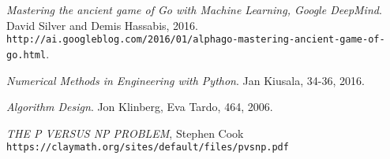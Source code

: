 \documentclass[a4paper]{article}
\numberwithin{equation}{subsection}
\begin{document}
\begin{thebibliography}{9}
\textit{Mastering the ancient game of Go with Machine Learning, Google DeepMind}.
 David Silver and Demis Hassabis, 2016.
\\\texttt{http://ai.googleblog.com/2016/01/alphago-mastering-ancient-game-of-go.html}.

\textit{Numerical Methods in Engineering with Python}.  
Jan Kiusala, 34-36, 2016.


\textit{Algorithm Design}.  
Jon Klinberg, Eva Tardo, 464, 2006.

\textit{THE P VERSUS NP PROBLEM},
Stephen Cook
\\\texttt{https://claymath.org/sites/default/files/pvsnp.pdf}
\end{thebibliography}
\end{document}
